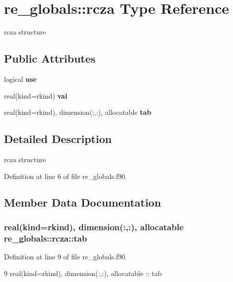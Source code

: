 \section{re\+\_\+globals\+:\+:rcza Type Reference}
\label{structre__globals_1_1rcza}


rcza structure  


\subsection*{Public Attributes}
\begin{DoxyCompactItemize}
\item 
logical {\bf use}
\item 
real(kind=rkind) {\bf val}
\item 
real(kind=rkind), dimension(\+:,\+:), allocatable {\bf tab}
\end{DoxyCompactItemize}


\subsection{Detailed Description}
rcza structure 

Definition at line 6 of file re\+\_\+globals.\+f90.



\subsection{Member Data Documentation}
\subsubsection[{tab}]{\setlength{\rightskip}{0pt plus 5cm}real(kind=rkind), dimension(\+:,\+:), allocatable re\+\_\+globals\+::rcza\+::tab}\label{structre__globals_1_1rcza_aa168a0c6b7ec0843d2e1f0db7adc0be3}


Definition at line 9 of file re\+\_\+globals.\+f90.


\begin{DoxyCode}
9     \textcolor{keywordtype}{real(kind=rkind)}, \textcolor{keywordtype}{dimension(:,:)}, \textcolor{keywordtype}{allocatable}   :: tab
\end{DoxyCode}
